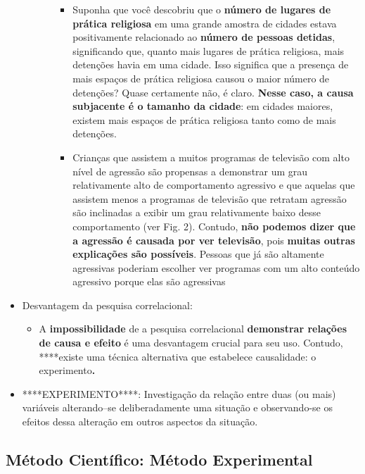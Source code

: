 \documentclass[
]{book}
\providecommand{\tightlist}{%
  \setlength{\itemsep}{0pt}\setlength{\parskip}{0pt}}
\begin{document}
\begin{itemize}
\begin{itemize}
\begin{itemize}
      \begin{itemize}
      \tightlist
      \item
        Suponha que você descobriu que o \textbf{número de lugares de prática religiosa} em uma grande amostra de cidades estava positivamente relacionado ao \textbf{número de pessoas detidas}, significando que, quanto mais lugares de prática religiosa, mais detenções havia em uma cidade. Isso significa que a presença de mais espaços de prática religiosa causou o maior número de detenções? Quase certamente não, é claro. \textbf{Nesse caso, a causa subjacente é o tamanho da cidade}: em cidades maiores, existem mais espaços de prática religiosa tanto como de mais detenções.
      \item
        Crianças que assistem a muitos programas de televisão com alto nível de agressão são propensas a demonstrar um grau relativamente alto de comportamento agressivo e que aquelas que assistem menos a programas de televisão que retratam agressão são inclinadas a exibir um grau relativamente baixo desse comportamento (ver Fig. 2). Contudo, \textbf{não podemos dizer que a agressão é causada por ver televisão}, pois \textbf{muitas outras explicações são possíveis}. Pessoas que já são altamente agressivas poderiam escolher ver programas com um alto conteúdo agressivo porque elas são agressivas
      \end{itemize}
    \end{itemize}
  \end{itemize}
\item
  Desvantagem da pesquisa correlacional:

  \begin{itemize}
  \tightlist
  \item
    A \textbf{impossibilidade} de a pesquisa correlacional \textbf{demonstrar relações de causa e efeito} é uma desvantagem crucial para seu uso. Contudo, ****existe uma técnica alternativa que estabelece causalidade: o experimento\textbf{.}
  \end{itemize}
\item
  ****EXPERIMENTO****: Investigação da relação entre duas (ou mais) variáveis alterando--se deliberadamente uma situação e observando-se os efeitos dessa alteração em outros aspectos da situação.
\end{itemize}

\hypertarget{muxe9todo-cientuxedfico-muxe9todo-experimental}{%
\subsection{Método Científico: Método Experimental}\label{muxe9todo-cientuxedfico-muxe9todo-experimental}}
\end{document}
